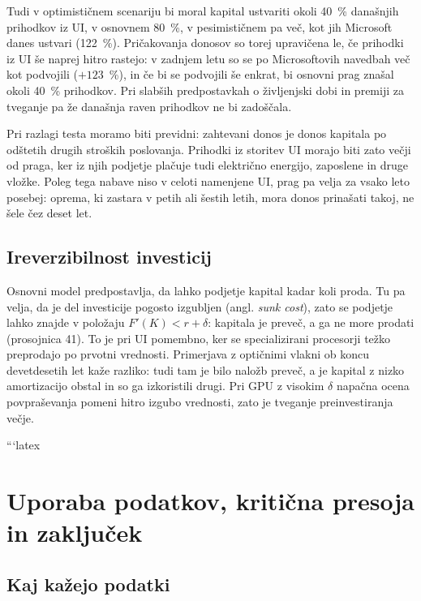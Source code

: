 \documentclass[12pt,a4paper]{article}
\begin{document}
Tudi v optimističnem scenariju bi moral kapital ustvariti okoli 40~\% današnjih prihodkov iz UI, v osnovnem 80~\%, v pesimističnem pa več, kot jih Microsoft danes ustvari (122~\%). Pričakovanja donosov so torej upravičena le, če prihodki iz UI še naprej hitro rastejo: v zadnjem letu so se po Microsoftovih navedbah več kot podvojili ($+123$~\%), in če bi se podvojili še enkrat, bi osnovni prag znašal okoli 40~\% prihodkov. Pri slabših predpostavkah o življenjski dobi in premiji za tveganje pa že današnja raven prihodkov ne bi zadoščala.

Pri razlagi testa moramo biti previdni: zahtevani donos je donos kapitala po odštetih drugih stroških poslovanja. Prihodki iz storitev UI morajo biti zato večji od praga, ker iz njih podjetje plačuje tudi električno energijo, zaposlene in druge vložke. Poleg tega nabave niso v celoti namenjene UI, prag pa velja za vsako leto posebej: oprema, ki zastara v petih ali šestih letih, mora donos prinašati takoj, ne šele čez deset let.

\subsection{Ireverzibilnost investicij}

Osnovni model predpostavlja, da lahko podjetje kapital kadar koli proda. Tu pa velja, da je del investicije pogosto izgubljen (angl. \textit{sunk cost}), zato se podjetje lahko znajde v položaju $F'(K) < r + \delta$: kapitala je preveč, a ga ne more prodati (prosojnica 41). To je pri UI pomembno, ker se specializirani procesorji težko preprodajo po prvotni vrednosti. Primerjava z optičnimi vlakni ob koncu devetdesetih let kaže razliko: tudi tam je bilo naložb preveč, a je kapital z nizko amortizacijo obstal in so ga izkoristili drugi. Pri GPU z visokim $\delta$ napačna ocena povpraševanja pomeni hitro izgubo vrednosti, zato je tveganje preinvestiranja večje.

```latex
\section{Uporaba podatkov, kritična presoja in zaključek}
\label{sec:podatki}

\subsection{Kaj kažejo podatki}
\end{document}
